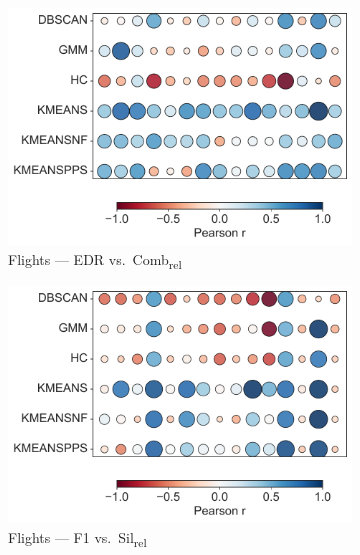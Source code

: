 \documentclass[10pt]{article} %
\numberwithin{equation}{section}
\begin{document}
\begin{enumerate}[label=(\alph*)]
\begin{figure}[H]
  \begin{subfigure}[b]{0.33\linewidth}
    \includegraphics[width=\linewidth]{figures/6.4.3graph/FL_EDR_vs_Comb_relative.pdf}
    \caption{Flights — EDR vs.\ Comb\textsubscript{rel}}
    \label{fig:fl_edr_comb}
  \end{subfigure}\hfill
  \begin{subfigure}[b]{0.33\linewidth}
    \includegraphics[width=\linewidth]{figures/6.4.3graph/FL_F1_vs_Sil_relative.pdf}
    \caption{Flights — F1 vs.\ Sil\textsubscript{rel}}
    \label{fig:fl_f1_sil}
  \end{subfigure}\hfill
  \begin{subfigure}[b]{0.33\linewidth}

\end{subfigure}
\end{figure}
\end{enumerate}
\end{document}
